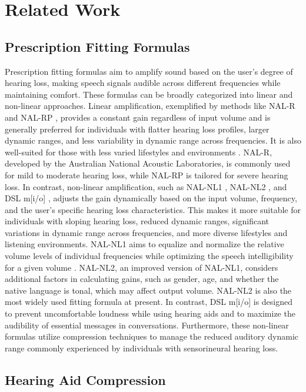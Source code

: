 \section{Related Work}
\label{sec:related}

\subsection{Prescription Fitting Formulas}
Prescription fitting formulas aim to amplify sound based on the user's degree of hearing loss, making speech signals audible across different frequencies while maintaining comfort. These formulas can be broadly categorized into linear and non-linear approaches. Linear amplification, exemplified by methods like NAL-R and NAL-RP \cite{NAL-RP}, provides a constant gain regardless of input volume and is generally preferred for individuals with flatter hearing loss profiles, larger dynamic ranges, and less variability in dynamic range across frequencies. It is also well-suited for those with less varied lifestyles and environments \cite{Compression}. NAL-R, developed by the Australian National Acoustic Laboratories, is commonly used for mild to moderate hearing loss, while NAL-RP is tailored for severe hearing loss. In contrast, non-linear amplification, such as NAL-NL1 \cite{NAL-NL1}, NAL-NL2 \cite{NAL-NL2}, and DSL m[i/o] \cite{DSLm}, adjusts the gain dynamically based on the input volume, frequency, and the user's specific hearing loss characteristics. This makes it more suitable for individuals with sloping hearing loss, reduced dynamic ranges, significant variations in dynamic range across frequencies, and more diverse lifestyles and listening environments. NAL-NL1 aims to equalize and normalize the relative volume levels of individual frequencies while optimizing the speech intelligibility for a given volume \cite{NAL-NL1}. NAL-NL2, an improved version of NAL-NL1, considers additional factors in calculating gains, such as gender, age, and whether the native language is tonal, which may affect output volume. NAL-NL2 is also the most widely used fitting formula at present. In contrast, DSL m[i/o] is designed to prevent uncomfortable loudness while using hearing aids and to maximize the audibility of essential messages in conversations. Furthermore, these non-linear formulas utilize compression techniques to manage the reduced auditory dynamic range commonly experienced by individuals with sensorineural hearing loss.

\subsection{Hearing Aid Compression}

